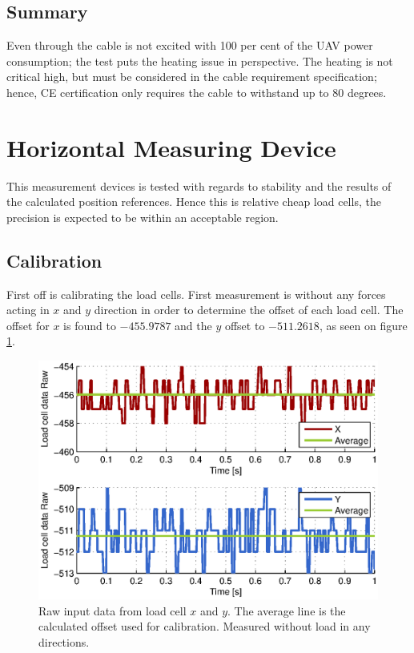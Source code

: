 \subsection{Summary}
Even through the cable is not excited with 100 per cent of the UAV power consumption; the test puts the heating issue in perspective. The heating is not critical high, but must be considered in the cable requirement specification; hence, CE certification only requires the cable to withstand up to 80 degrees\cite{Parliament2006}.    



\section{Horizontal Measuring Device}
This measurement devices is tested with regards to stability and the results of the calculated position references. Hence this is relative cheap load cells, the precision is expected to be within an acceptable region.

\subsection{Calibration}
First off is calibrating the load cells. First measurement is without any forces acting in $x$ and $y$ direction in order to determine the offset of each load cell.
The offset for $x$ is found to $-455.9787$ and the $y$ offset to $-511.2618$, as seen on figure \ref{fig:HMDcalib}.\\

\begin{figure}[hbtp]
\centering
\includegraphics[scale=1]{graphics/gcs_test/calib_0_data_raw.eps}
\caption[Raw data from load cell, GCS]{Raw input data from load cell $x$ and $y$. The average line is the calculated offset used for calibration. Measured without load in any directions.}
\label{fig:HMDcalib}
\end{figure}

